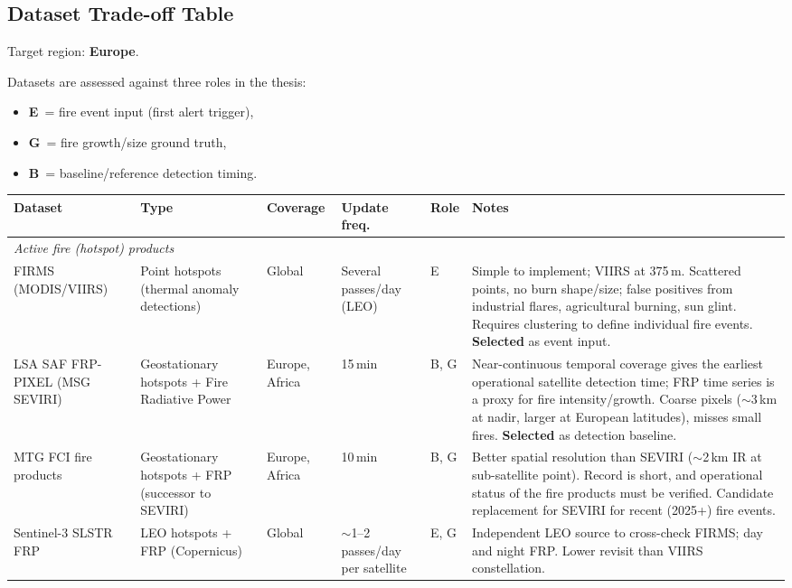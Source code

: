\documentclass[11pt]{article}
\begin{document}
\subsection{Dataset Trade-off Table}

Target region: \textbf{Europe}.

Datasets are assessed against three roles in the thesis:
\begin{itemize}
    \item \textbf{E}~= fire event input (first alert trigger),
    \item \textbf{G}~= fire growth/size ground truth,
    \item \textbf{B}~= baseline/reference detection timing.
\end{itemize}

\begin{longtable}{p{2.2cm}p{2.6cm}p{1.7cm}p{1.8cm}p{1.0cm}p{4.9cm}}
\toprule
\textbf{Dataset} & \textbf{Type} & \textbf{Coverage} & \textbf{Update freq.} & \textbf{Role} & \textbf{Notes} \\
\midrule
\endhead

\multicolumn{6}{l}{\textit{Active fire (hotspot) products}} \\
\midrule
FIRMS (MODIS/VIIRS) & Point hotspots (thermal anomaly detections) & Global & Several passes/day (LEO) & E & Simple to implement; VIIRS at 375\,m. Scattered points, no burn shape/size; false positives from industrial flares, agricultural burning, sun glint. Requires clustering to define individual fire events. \textbf{Selected} as event input. \\
LSA SAF FRP-PIXEL (MSG SEVIRI) & Geostationary hotspots + Fire Radiative Power & Europe, Africa & 15\,min & B, G & Near-continuous temporal coverage gives the earliest operational satellite detection time; FRP time series is a proxy for fire intensity/growth. Coarse pixels ($\sim$3\,km at nadir, larger at European latitudes), misses small fires. \textbf{Selected} as detection baseline. \\
MTG FCI fire products & Geostationary hotspots + FRP (successor to SEVIRI) & Europe, Africa & 10\,min & B, G & Better spatial resolution than SEVIRI ($\sim$2\,km IR at sub-satellite point). Record is short, and operational status of the fire products must be verified. Candidate replacement for SEVIRI for recent (2025+) fire events. \\
Sentinel-3 SLSTR FRP & LEO hotspots + FRP (Copernicus) & Global & $\sim$1--2 passes/day per satellite & E, G & Independent LEO source to cross-check FIRMS; day and night FRP. Lower revisit than VIIRS constellation. \\
\midrule


\end{longtable}
\end{document}
